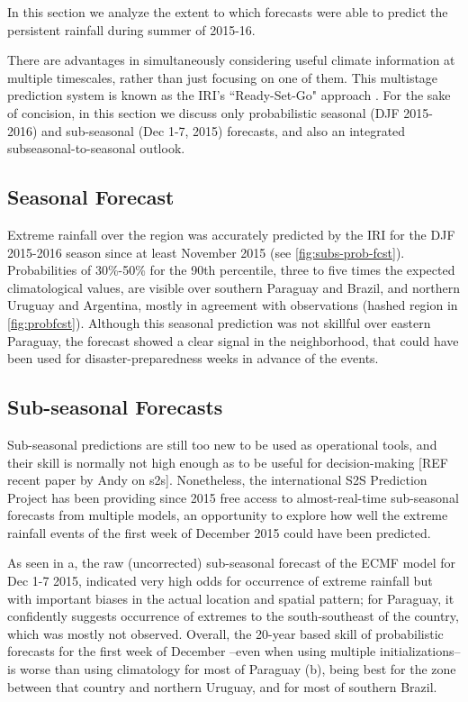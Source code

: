 \documentclass[twocol]{ametsoc}
\begin{document}
In this section we analyze the extent to which forecasts were able to predict the persistent rainfall during summer of 2015-16.

There are advantages in simultaneously considering useful climate information at multiple timescales, rather than just focusing on one of them.
This multistage prediction system is known as the IRI's ``Ready-Set-Go" approach \citep{Goddard:2014kf,Munoz2016}.
For the sake of concision, in this section we discuss only probabilistic seasonal (DJF 2015-2016) and sub-seasonal (Dec 1-7, 2015) forecasts, and also an integrated subseasonal-to-seasonal outlook.

\subsection{Seasonal Forecast}

Extreme rainfall over the region was accurately predicted by the IRI for the DJF 2015-2016 season since at least November 2015 (see \cref{fig:subs-prob-fcst}). Probabilities of 30\%-50\% for the 90th percentile, three to five times the expected climatological values, are visible over southern Paraguay and Brazil, and northern Uruguay and Argentina, mostly in agreement with observations (hashed region in \cref{fig:probfcst}).
Although this seasonal prediction was not skillful over eastern Paraguay, the forecast  showed a clear signal in the neighborhood, that could have been used for disaster-preparedness weeks in advance of the events.

\subsection{Sub-seasonal Forecasts}
Sub-seasonal predictions are still too new to be used as operational tools, and their skill is normally not high enough as to be useful for decision-making [REF recent paper by Andy on s2s]. Nonetheless, the international S2S Prediction Project \citep{Vitart2016} has been providing since 2015 free access to almost-real-time sub-seasonal forecasts from multiple models, an opportunity to explore how well the extreme rainfall events of the first week of December 2015 could have been predicted.

As seen in a, the raw (uncorrected) sub-seasonal forecast of the ECMF model for Dec 1-7 2015, indicated very high odds for occurrence of extreme rainfall but with important biases in the actual location and spatial pattern; for Paraguay, it confidently suggests occurrence of extremes to the south-southeast of the country, which was mostly not observed. Overall, the 20-year based skill of probabilistic forecasts for the first week of December --even when using multiple initializations-- is worse than using climatology for most of Paraguay (b), being best for the zone between that country and northern Uruguay, and for most of southern Brazil.
\end{document}
